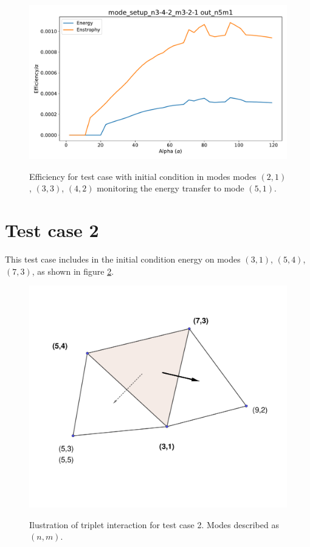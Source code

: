 \documentclass[a4paper,10pt]{article}
\begin{document}
\begin{figure}
\centering
 \includegraphics[scale=0.4]{figs/mode_setup_n3-4-2_m3-2-1_out_n5m1.pdf}
 \label{tc1-eficiency}
 \caption{Efficiency for test case with initial condition in modes modes $(2,1)$, $(3,3)$, $(4,2)$ monitoring the energy transfer to mode $(5,1)$.}
\end{figure}



\clearpage 

\section{Test case 2}


This test case includes in the initial condition energy on modes $(3,1)$, $(5,4)$, $(7,3)$, as shown in figure \ref{fig:tc-9-2-diagram}. 

\begin{figure}[h!]
\centering
 \includegraphics[scale=0.3]{figs/Nonlinear interaction diagram-TC-9-2.pdf}
 \label{fig:tc-9-2-diagram}
 \caption{Ilustration of triplet interaction for test case 2. Modes described as $(n,m)$.}
\end{figure}
\end{document}
